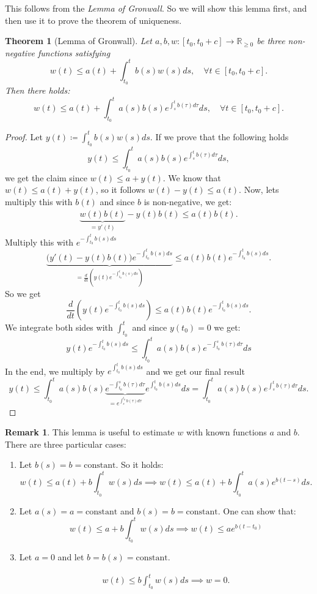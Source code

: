 \documentclass[hidelinks,a4paper, 11pt]{article}
\theoremstyle{plain}
\newtheorem{theorem}{Theorem}
\theoremstyle{break}
\theoremstyle{plain}
\theoremstyle{definition}
\newtheorem*{remark}{Remark}
\begin{document}
This follows from the  \emph{Lemma of Gronwall}. So we will show this lemma first, and then use it to prove the theorem of uniqueness.

\begin{theorem}[Lemma of Gronwall]
	Let $a,b,w: [t_0, t_0 +c] \to \mathbb R_{\geq 0}$ be three non-negative functions satisfying 
	\[
		w(t) \leq a(t) + \int^t_{t_0} b(s)w(s) ds, \quad \forall t \in [t_0, t_0 + c].
	\]
	Then there holds:
	\[
		w(t) \leq a(t) + \int^t_{t_0} a(s)b(s) e^{\int^t_sb(\tau) d\tau}ds, \quad \forall t \in [t_0, t_0 + c].
	\]
\end{theorem}

\begin{proof}
	Let $y(t) \coloneqq \int^t_{t_0} b(s)w(s) ds$. If we prove that the following holds
	\[
		y(t) \leq \int^t_{t_0}a(s)b(s)e^{\int^t_s b(\tau)d\tau}ds,
	\]
	we get the claim since $w(t) \leq a +y(t)$. We know that $w(t) \leq a(t) + y(t)$, so it follows $w(t)-y(t) \leq a(t)$. Now, lets multiply this with $b(t)$ and since $b$ is non-negative, we get:
	\begin{align*}
		\underbrace{w(t)b(t)}_{=y'(t)} - y(t)b(t) \leq a(t)b(t).
	\end{align*}
	Multiply this with $e^{-\int^t_{t_0}b(s)ds}$
	\[
		\underbrace{\Big(y'(t) - y(t)b(t)\Big)e^{-\int^t_{t_0}b(s)ds}}_{=\frac{d}{dt}\left(y(t)e^{-\int^t_{t_0}b(s)ds}\right) } \leq a(t)b(t) e^{-\int^t_{t_0}b(s)ds}.
	\]
	So we get
	\[
		\frac{d}{dt}\left(y(t)e^{-\int^t_{t_0}b(s)ds}\right)  \leq  a(t)b(t) e^{-\int^t_{t_0}b(s)ds}.
	\]
	We integrate both sides with $\int^t_{t_0}$ and since $y(t_0) = 0$ we get:
	\[
		y(t)e^{-\int^t_{t_0}b(s)ds} \leq \int^t_{t_0}a(s)b(s) e^{-\int_{t_0}^s b(\tau) d\tau}ds
	\]
	In the end, we multiply by $e^{\int_{t_0}^t b(s) ds}$ and we get our final result
	\[
		y(t) \leq  \int^t_{t_0}a(s)b(s) \underbrace{e^{-\int^{s}_{t_0} b(\tau)d\tau}}_{=e^{\int_{s}^{t_0} b(\tau) d\tau}} e^{\int_{t_0}^t b(s) ds}ds = \int^t_{t_0}a(s)b(s) e^{\int^t_s b(\tau)d\tau}ds.
	\]
\end{proof}

\begin{remark}
This lemma is useful to estimate $w$ with known functions $a$ and $b$. There are three particular cases: 
\begin{enumerate}
	\item Let $b(s) = b = \text{constant}$. So it holds:
	 \[
	w(t) \leq a(t) + b \int^t_{t_0}w(s) ds \implies w(t) \leq a(t) + b \int^t_{t_0}a(s)e^{b(t-s)}ds.
	\]
	
	\item Let $a(s) = a = \text{constant}$ and $b(s) = b = \text{constant}$. One can show that:
	\[
		w(t) \leq a+b \int^t_{t_0}w(s)ds \implies w(t) \leq ae^{b(t-t_0)}
	\]
	
	\item Let $a=0$ and let $b = b(s) = \text{constant}$. \begin{framed}
	\begin{align}\label{chap2:gronwallcase3}
		w(t) \leq b\int^t_{t_0}w(s)ds \implies w = 0.
	\end{align}\end{framed}
\end{enumerate}
\end{remark}
\end{document}
